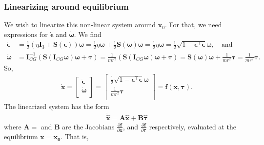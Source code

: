 \subsubsection{Linearizing around equilibrium}
We wish to linearize this non-linear system around $\mathbf{x}_0$. For that, we need expressions for $\dot{\boldsymbol{\epsilon}}$ and $\dot{\boldsymbol{\omega}}$. We find
\begin{align}
\dot{\boldsymbol{\epsilon}}
&= \frac{1}{2}(\eta \mathbf{I}_3 + \mathbf{S}(\boldsymbol{\epsilon}))\boldsymbol{\omega}
= \frac{1}{2}\eta \boldsymbol{\omega} + \frac{1}{2}\mathbf{S}(\boldsymbol{\omega})\boldsymbol{\omega}
= \frac{1}{2}\eta \boldsymbol{\omega}
= \frac{1}{2}\sqrt{1 - \boldsymbol{\epsilon}^\top\boldsymbol{\epsilon}}\boldsymbol{\omega}, \quad \text{and} \\
\dot{\boldsymbol{\omega}}
&= \mathbf{I}_{CG}^{-1}(\mathbf{S}(\mathbf{I}_{CG}\boldsymbol{\omega})\boldsymbol{\omega} + \boldsymbol{\tau})
=\frac{1}{mr^2}(\mathbf{S}(\mathbf{I}_{CG}\boldsymbol{\omega})\boldsymbol{\omega} + \boldsymbol{\tau})
= \boldsymbol{S}(\boldsymbol{\omega})\boldsymbol{\omega} + \frac{1}{mr^2}\boldsymbol{\tau}
= \frac{1}{mr^2}\boldsymbol{\tau}.
\end{align}
So,
\begin{equation}\begin{aligned}
\dot{\mathbf{x}} =
\begin{bmatrix}
\dot{\boldsymbol{\epsilon}}\\
\dot{\boldsymbol{\omega}}\\
\end{bmatrix}
=\begin{bmatrix}
\frac{1}{2}\sqrt{1-\boldsymbol{\epsilon}^\top\boldsymbol{\epsilon}}\boldsymbol{\omega}\\
\frac{1}{mr^2}\boldsymbol{\tau}\\
\end{bmatrix}
= \mathbf{f}(\mathbf{x}, \boldsymbol{\tau}).
\end{aligned}\end{equation}
The linearized system has the form
\begin{equation}\begin{aligned}
\dot{\hat{\mathbf{x}}} = \mathbf{A}\hat{\mathbf{x}} + \mathbf{B}\hat{\boldsymbol{\tau}}
\end{aligned}\end{equation}
where $\mathbf{A} = $ and $\mathbf{B}$ are the Jacobians $\frac{\partial \mathbf{f}}{\partial \mathbf{x}}$, and $\frac{\partial \mathbf{f}}{\partial \boldsymbol{\tau}}$ respectively, evaluated at the equilibrium $\mathbf{x}=\mathbf{x_0}$. That is,
